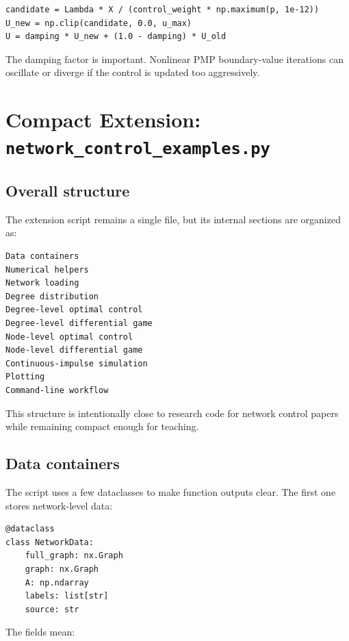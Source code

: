 \documentclass[11pt,a4paper]{article}
\begin{document}
\begin{lstlisting}[style=py]
candidate = Lambda * X / (control_weight * np.maximum(p, 1e-12))
U_new = np.clip(candidate, 0.0, u_max)
U = damping * U_new + (1.0 - damping) * U_old
\end{lstlisting}

The damping factor is important. Nonlinear PMP boundary-value iterations can oscillate or diverge if the control is updated too aggressively.

\section[Compact Extension: network\_control\_examples.py]{Compact Extension: \texttt{network\_control\_examples.py}}

\subsection{Overall structure}

The extension script remains a single file, but its internal sections are organized as:

\begin{lstlisting}[style=text]
Data containers
Numerical helpers
Network loading
Degree distribution
Degree-level optimal control
Degree-level differential game
Node-level optimal control
Node-level differential game
Continuous-impulse simulation
Plotting
Command-line workflow
\end{lstlisting}

This structure is intentionally close to research code for network control papers while remaining compact enough for teaching.

\subsection{Data containers}

The script uses a few dataclasses to make function outputs clear. The first one stores network-level data:

\begin{lstlisting}[style=py]
@dataclass
class NetworkData:
    full_graph: nx.Graph
    graph: nx.Graph
    A: np.ndarray
    labels: list[str]
    source: str
\end{lstlisting}

The fields mean:
\end{document}
